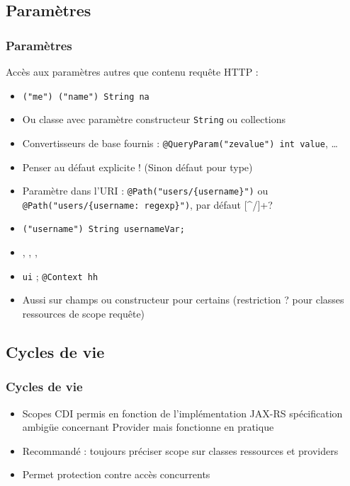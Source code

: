 \documentclass[english, french]{beamer}
\begin{document}
\subsection{Paramètres}
\begin{frame}
	\frametitle{Paramètres}
	Accès aux paramètres autres que contenu requête HTTP :
	\begin{itemize}
		\item \texttt{("me") ("name") String na}
		\item Ou classe avec paramètre constructeur \texttt{String} {\tiny ou collections}
		\item Convertisseurs de base fournis : \texttt{@QueryParam("zevalue") int value}, …
		\item Penser au défaut explicite ! (Sinon défaut pour type)
		\item Paramètre dans l’URI : \texttt{@Path("users/\{username\}")} {\tiny ou \texttt{@Path("users/\{username: regexp\}")}, par défaut [\^{}/]+?}
		\item \texttt{("username") String usernameVar;}
		\item {}, , , 
		\item {}  \texttt{ui} ; \texttt{@Context  hh}
		\item Aussi sur champs {\tiny ou constructeur pour certains} (restriction ? \pause pour classes ressources de scope requête)
	\end{itemize}
\end{frame}


\subsection{Cycles de vie}
\begin{frame}
	\frametitle{Cycles de vie}
	\begin{itemize}
		\item Scopes CDI permis {\tiny en fonction de l’implémentation JAX-RS} {\tiny spécification ambigüe concernant Provider mais fonctionne en pratique}
		\item Recommandé : toujours préciser scope sur classes ressources et providers
		\item Permet protection contre accès concurrents
	\end{itemize}
\end{frame}
\end{document}
